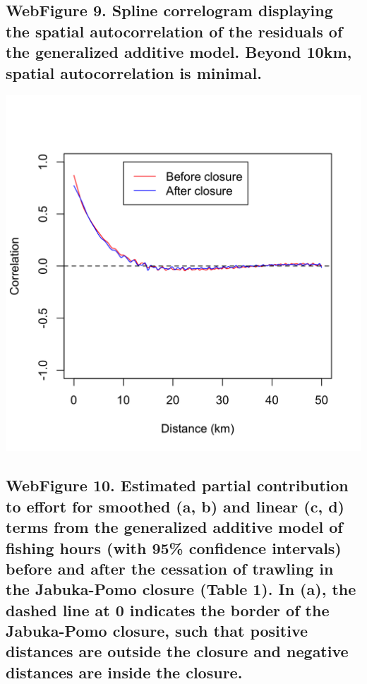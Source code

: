 \documentclass[11pt,]{article}
\begin{document}
\newpage

\subsection{WebFigure 9. Spline correlogram displaying the spatial
autocorrelation of the residuals of the generalized additive model.
Beyond 10km, spatial autocorrelation is
minimal.}\label{webfigure-9.-spline-correlogram-displaying-the-spatial-autocorrelation-of-the-residuals-of-the-generalized-additive-model.-beyond-10km-spatial-autocorrelation-is-minimal.}

\includegraphics[width=1.00000\textwidth]{../ms_1/ms_1_figs/plot_correlogram.png}

\newpage

\subsection{WebFigure 10. Estimated partial contribution to effort for
smoothed (a, b) and linear (c, d) terms from the generalized additive
model of fishing hours (with 95\% confidence intervals) before and after
the cessation of trawling in the Jabuka-Pomo closure (Table 1). In (a),
the dashed line at 0 indicates the border of the Jabuka-Pomo closure,
such that positive distances are outside the closure and negative
distances are inside the
closure.}\label{webfigure-10.-estimated-partial-contribution-to-effort-for-smoothed-a-b-and-linear-c-d-terms-from-the-generalized-additive-model-of-fishing-hours-with-95-confidence-intervals-before-and-after-the-cessation-of-trawling-in-the-jabuka-pomo-closure-table-1.-in-a-the-dashed-line-at-0-indicates-the-border-of-the-jabuka-pomo-closure-such-that-positive-distances-are-outside-the-closure-and-negative-distances-are-inside-the-closure.}
\end{document}

